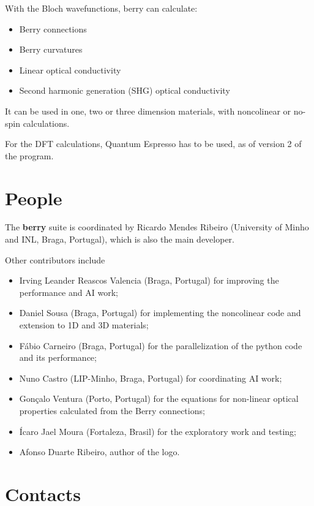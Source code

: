 \documentclass[a4paper,12pt]{report}
\begin{document}
With the Bloch wavefunctions, berry can calculate:
\begin{itemize}
  \item Berry connections
  \item Berry curvatures
  \item Linear optical conductivity
  \item Second harmonic generation (SHG) optical conductivity
\end{itemize}

It can be used in one, two or three dimension materials, with noncolinear or no-spin calculations.

For the DFT calculations, {\sc Quantum Espresso}\cite{Giannozzi2009,Giannozzi2017} has to be used,
as of version 2 of the program.




\newpage
\section{People}

The \textbf{berry} suite is coordinated by Ricardo Mendes Ribeiro (University of Minho and INL, Braga, Portugal),
which is also the main developer.\medskip

Other contributors include
\begin{itemize}
 \item Irving Leander Reascos Valencia (Braga, Portugal) for improving the performance
 and AI work;
 \item Daniel Sousa (Braga, Portugal) for implementing the noncolinear code
 and extension to 1D and 3D materials;
 \item Fábio Carneiro (Braga, Portugal) for the parallelization of the python code
 and its performance;
 \item Nuno Castro (LIP-Minho, Braga, Portugal) for coordinating AI work;
 \item Gonçalo Ventura (Porto, Portugal) for the equations for non-linear optical properties
 calculated from the Berry connections;
 \item Ícaro Jael Moura (Fortaleza, Brasil) for the exploratory work and testing;
 \item Afonso Duarte Ribeiro, author of the logo.
\end{itemize}




\section{Contacts}
\end{document}
